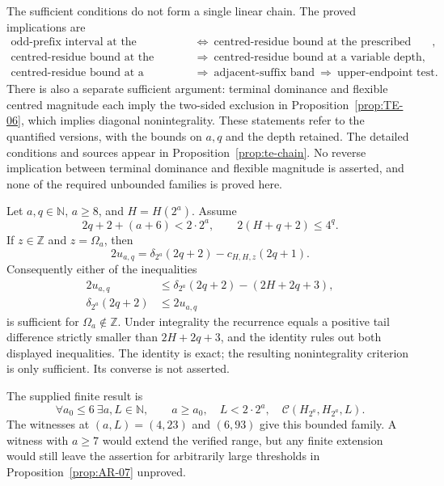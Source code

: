 \begin{prop}\label{prop:TE-05}
The sufficient conditions do not form a single linear chain. The proved
implications are
\[
 \begin{aligned}
 \text{odd-prefix interval at the prescribed depth}
 &\ \Longleftrightarrow\ \text{centred-residue bound at the prescribed depth},\\
 \text{centred-residue bound at the prescribed depth}
 &\ \Longrightarrow\ \text{centred-residue bound at a variable depth},\\
 \text{centred-residue bound at a variable depth}
 &\ \Longrightarrow\ \text{adjacent-suffix band}
   \ \Longrightarrow\ \text{upper-endpoint test}.
 \end{aligned}
\]
There is also a separate sufficient argument: terminal dominance and
flexible centred magnitude each imply the two-sided exclusion in
Proposition~\ref{prop:TE-06}, which implies diagonal nonintegrality.
These statements refer to the quantified versions, with the bounds on
$a,q$ and the depth retained. The detailed conditions and sources appear
in Proposition~\ref{prop:te-chain}. No reverse implication between
terminal dominance and flexible magnitude is asserted, and none of the
required unbounded families is proved here.
\end{prop}

\begin{prop}\label{prop:TE-06}
Let $a,q\in\mathbb N$, $a\ge8$, and $H=H(2^a)$. Assume
\[
 2q+2+(a+6)<2\cdot2^a,\qquad 2(H+q+2)\le4^q.
\]
If $z\in\mathbb Z$ and $z=\Omega_a$, then
\[
 2u_{a,q}=\delta_{2^a}(2q+2)-c_{H,H,z}(2q+1).
\]
Consequently either of the inequalities
\[
 \begin{aligned}
 2u_{a,q}&\le\delta_{2^a}(2q+2)-(2H+2q+3),\\
 \delta_{2^a}(2q+2)&\le2u_{a,q}
 \end{aligned}
\]
is sufficient for $\Omega_a\notin\mathbb Z$. Under integrality the
recurrence equals a positive tail difference strictly smaller than
$2H+2q+3$, and the identity rules out both displayed inequalities.
The identity is exact; the resulting nonintegrality criterion is only
sufficient. Its converse is not asserted.
\end{prop}

\begin{prop}\label{prop:SK-02}
The supplied finite result is
\[
 \forall a_0\le6\ \exists a,L\in\mathbb N,\qquad
 a\ge a_0,\quad L<2\cdot2^a,\quad
 \mathcal C(H_{2^a},H_{2^a},L).
\]
The witnesses at $(a,L)=(4,23)$ and $(6,93)$ give this bounded family.
A witness with $a\ge7$ would extend the verified range, but any finite
extension would still leave the assertion for arbitrarily large
thresholds in Proposition~\ref{prop:AR-07} unproved.

\end{prop}

